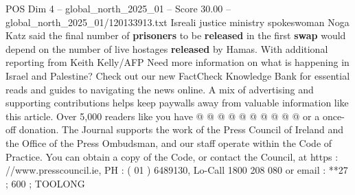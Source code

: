 \begin{textsample}{POS Dim 4 – global\_north\_2025\_01 – Score 30.00 – global\_north\_2025\_01/120133913.txt}
Isreali justice ministry spokeswoman Noga Katz said the final number of \textbf{prisoners} to be \textbf{released} in the first \textbf{swap} would depend on the number of live hostages \textbf{released} by Hamas.
With additional reporting from Keith Kelly/AFP Need more information on what is happening in Israel and Palestine?
Check out our new FactCheck Knowledge Bank for essential reads and guides to navigating the news online.
A mix of advertising and supporting contributions helps keep paywalls away from valuable information like this article.
Over 5,000 readers like you have @ @ @ @ @ @ @ @ @ @ or a once-off donation.
The Journal supports the work of the Press Council of Ireland and the Office of the Press Ombudsman, and our staff operate within the Code of Practice.
You can obtain a copy of the Code, or contact the Council, at https : //www.presscouncil.ie, PH : ( 01 ) 6489130, Lo-Call 1800 208 080 or email : **27 ; 600 ; TOOLONG

\end{textsample}
